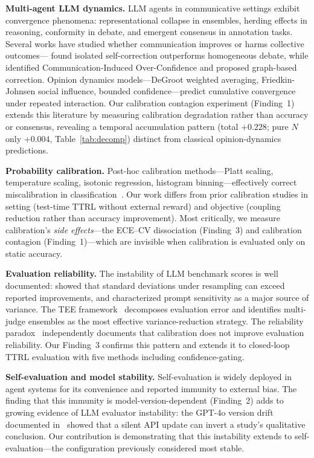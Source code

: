 \documentclass[11pt]{article}
\theoremstyle{definition}
\theoremstyle{remark}
\begin{document}
\textbf{Multi-agent LLM dynamics.} LLM agents in communicative settings exhibit convergence phenomena: representational collapse in ensembles, herding effects in reasoning, conformity in debate, and emergent consensus in annotation tasks. Several works have studied whether communication improves or harms collective outcomes---\citet{bertalanic2026cost} found isolated self-correction outperforms homogeneous debate, while \citet{huang2026cagecal} identified Communication-Induced Over-Confidence and proposed graph-based correction. Opinion dynamics models---DeGroot weighted averaging, Friedkin-Johnsen social influence, bounded confidence---predict cumulative convergence under repeated interaction. Our calibration contagion experiment (Finding~1) extends this literature by measuring calibration degradation rather than accuracy or consensus, revealing a temporal accumulation pattern (total $+0.228$; pure $N$ only $+0.004$, Table~\ref{tab:decomp}) distinct from classical opinion-dynamics predictions.

\textbf{Probability calibration.} Post-hoc calibration methods---Platt scaling, temperature scaling, isotonic regression, histogram binning---effectively correct miscalibration in classification~\citep{guo2017calibration,niculescu2005predicting}. Our work differs from prior calibration studies in setting (test-time TTRL without external reward) and objective (coupling reduction rather than accuracy improvement). Most critically, we measure calibration's \textit{side effects}---the ECE--CV dissociation (Finding~3) and calibration contagion (Finding~1)---which are invisible when calibration is evaluated only on static accuracy.

\textbf{Evaluation reliability.} The instability of LLM benchmark scores is well documented: \citet{dodge2019reproducibility} showed that standard deviations under resampling can exceed reported improvements, and \citet{sclar2024quantifying} characterized prompt sensitivity as a major source of variance. The TEE framework~\citep{messing2026tee} decomposes evaluation error and identifies multi-judge ensembles as the most effective variance-reduction strategy. The reliability paradox~\citep{messing2026tee} independently documents that calibration does not improve evaluation reliability. Our Finding~3 confirms this pattern and extends it to closed-loop TTRL evaluation with five methods including confidence-gating.

\textbf{Self-evaluation and model stability.} Self-evaluation is widely deployed in agent systems for its convenience and reported immunity to external bias. The finding that this immunity is model-version-dependent (Finding~2) adds to growing evidence of LLM evaluator instability: the GPT-4o version drift documented in~\citep{epc2026} showed that a silent API update can invert a study's qualitative conclusion. Our contribution is demonstrating that this instability extends to self-evaluation---the configuration previously considered most stable.
\end{document}
